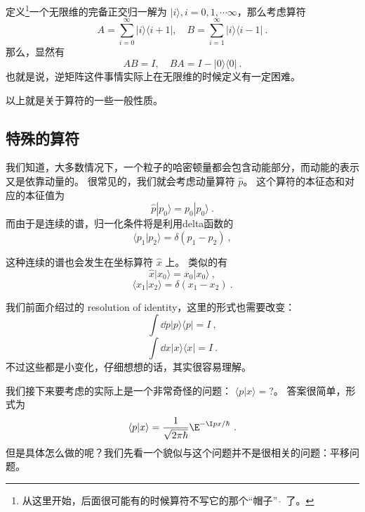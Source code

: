 \begin{example}{}
定义\footnote{从这里开始，后面很可能有的时候算符不写它的那个“帽子” $\hat{\ }$ 了。}一个无限维的完备正交归一解为 $|i\rangle, i = 0, 1, \cdots \infty$，那么考虑算符
\begin{equation}
A =  \sum_{i = 0}^{\infty} |i\rangle\langle i+1|,\quad B = \sum_{i = 1}^{\infty}|i\rangle\langle i-1|~.
\end{equation}
那么，显然有
\begin{equation}
AB = I,\quad BA = I - |0\rangle\langle0|~.
\end{equation}
也就是说，逆矩阵这件事情实际上在无限维的时候定义有一定困难。
\end{example}

以上就是关于算符的一些一般性质。

\subsection{特殊的算符}

我们知道，大多数情况下，一个粒子的哈密顿量都会包含动能部分，而动能的表示又是依靠动量的。 很常见的，我们就会考虑动量算符 $\hat p$。 这个算符的本征态和对应的本征值为
\begin{equation}
\hat p|p_0\rangle = p_0 |p_0\rangle~.
\end{equation}
而由于是连续的谱，归一化条件将是利用delta函数的
\begin{equation}
\langle p_1|p_2\rangle = \delta(p_1-p_2)~,
\end{equation}

这种连续的谱也会发生在坐标算符 $\hat x$ 上。 类似的有
\begin{equation}
\hat x|x_0\rangle = x_0 |x_0\rangle~,
\end{equation}
\begin{equation}
\langle x_1|x_2\rangle = \delta(x_1-x_2)~.
\end{equation}

我们前面介绍过的 resolution of identity，这里的形式也需要改变：
\begin{equation}
\int \dd{p}|p\rangle\langle p| = I~,
\end{equation}
\begin{equation}
\int \dd{x}|x\rangle\langle x| = I~.
\end{equation}
不过这些都是小变化，仔细想想的话，其实很容易理解。

我们接下来要考虑的实际上是一个非常奇怪的问题： $\langle p|x\rangle = ?$。 答案很简单，形式为
\begin{equation}
\langle p|x\rangle = \frac{1}{\sqrt{2\pi \hbar}}\E^{-\I px/\hbar}~.
\end{equation}
但是具体怎么做的呢？我们先看一个貌似与这个问题并不是很相关的问题：平移问题。

